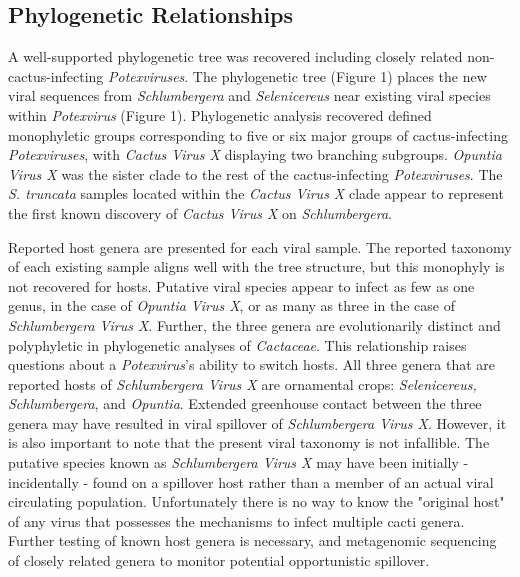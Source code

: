 \documentclass[11pt,letterpaper,titlepage]{article}
\begin{document}
\begin{linenumbers}
\subsection*{Phylogenetic Relationships}
A well-supported phylogenetic tree was recovered including closely related non-cactus-infecting \textit{Potexviruses}.
The phylogenetic tree (Figure 1) places the new viral sequences from \textit{Schlumbergera} and \textit{Selenicereus} near existing viral species within \textit{Potexvirus} (Figure 1). 
Phylogenetic analysis recovered defined monophyletic groups corresponding to five or six major groups of cactus-infecting \textit{Potexviruses}, with \textit{Cactus Virus X} displaying two branching subgroups.
\textit{Opuntia Virus X} was the sister clade to the rest of the cactus-infecting \textit{Potexviruses}.
The \textit{S. truncata }samples located within the \textit{Cactus Virus X }clade appear to represent the first known discovery of \textit{Cactus Virus X} on \textit{Schlumbergera}.

Reported host genera are presented for each viral sample. 
The reported taxonomy of each existing sample aligns well with the tree structure, but this monophyly is not recovered for hosts.
Putative viral species appear to infect as few as one genus, in the case of \textit{Opuntia Virus X}, or as many as three in the case of \textit{Schlumbergera Virus X}.
Further, the three genera are evolutionarily distinct and polyphyletic in phylogenetic analyses of \textit{Cactaceae}. 
This relationship raises questions about a \textit{Potexvirus}'s ability to switch hosts. %
All three genera that are reported hosts of \textit{Schlumbergera Virus X} are ornamental crops: \textit{Selenicereus, Schlumbergera}, and \textit{Opuntia}.
Extended greenhouse contact between the three genera may have resulted in viral spillover of \textit{Schlumbergera Virus X}.
However, it is also important to note that the present viral taxonomy is not infallible. 
The putative species known as \textit{Schlumbergera Virus X} may have been initially - incidentally - found on a spillover host rather than a member of an actual viral circulating population.
Unfortunately there is no way to know the "original host" of any virus that possesses the mechanisms to infect multiple cacti genera. 
Further testing of known host genera is necessary, and metagenomic sequencing of closely related genera to monitor potential opportunistic spillover. 


\end{linenumbers}
\end{document}
